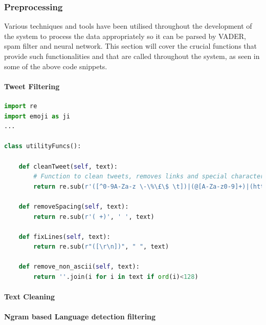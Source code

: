 \documentclass[oneside, 12pt]{article}
\begin{document}
			\subsubsection{Preprocessing}
			Various techniques and tools have been utilised throughout the development of the system to process the data appropriately so it can be parsed by VADER, spam filter and neural network. This section will cover the crucial functions that provide such functionalities and that are called throughout the system, as seen in some of the above code snippets.
				\paragraph{Tweet Filtering}
				
				\begin{lstlisting}[language=python, caption=Basic data filtering and processing function - defined in 'tweet\_collector.py']
import re
import emoji as ji
...

class utilityFuncs():
				
	def cleanTweet(self, text):
		# Function to clean tweets, removes links and special characters
		return re.sub(r'([^0-9A-Za-z \-\%\£\$ \t])|(@[A-Za-z0-9]+)|(http\S+)', '', text), ' '.join(c for c in text if c in ji.UNICODE_EMOJI)
				
	def removeSpacing(self, text):
		return re.sub(r'( +)', ' ', text)
				
	def fixLines(self, text):
		return re.sub(r"([\r\n])", " ", text)
								
	def remove_non_ascii(self, text):
		return ''.join(i for i in text if ord(i)<128)
				\end{lstlisting}
				\paragraph{Text Cleaning}
				\paragraph{Ngram based Language detection filtering}
			
\end{document}

